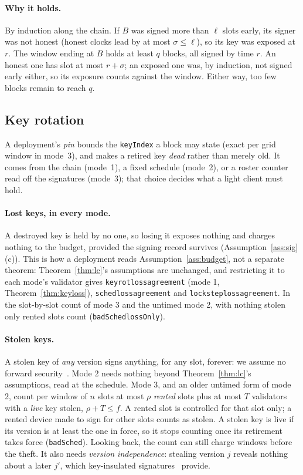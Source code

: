 \documentclass[10pt]{article}
\DeclareRobustCommand{\code}[1]{{\renewcommand{\_}{\textunderscore\allowbreak}\texttt{#1}}}
\newcommand{\quorum}{\ensuremath{q}}
\newcommand{\fmax}{\ensuremath{f}}
\begin{document}
\paragraph{Why it holds.} By induction along the chain. If $B$ was signed
more than $\ell$ slots early, its signer was not honest (honest clocks
lead by at most $\sigma \le \ell$), so its key was exposed at $r$. The
window ending at $B$ holds at least $\quorum$ blocks, all signed by time
$r$. An honest one has slot at most $r + \sigma$; an exposed one was, by
induction, not signed early either, so its exposure counts against the
window. Either way, too few blocks remain to reach $\quorum$.

\subsection{Key rotation}
\label{sec:rotation}

A deployment's \emph{pin} bounds the \code{keyIndex} a block may state
(exact per grid window in mode~3), and makes a retired key \emph{dead}
rather than merely old. It comes from the chain (mode~1), a fixed
schedule (mode~2), or a roster counter read off the signatures (mode~3);
that choice decides what a light client must hold.

\paragraph{Lost keys, in every mode.} A destroyed key is held by no one,
so losing it exposes nothing and charges nothing to the budget, provided
the signing record survives (Assumption~\ref{ass:sig}(c)). This is how a
deployment reads Assumption~\ref{ass:budget}, not a separate theorem:
Theorem~\ref{thm:lc}'s assumptions are unchanged, and restricting it to
each mode's validator gives \code{keyrot\_loss\_agreement} (mode 1,
Theorem~\ref{thm:keyloss}), \code{sched\_loss\_agreement} and
\code{lockstep\_loss\_agreement}. In the slot-by-slot count of mode 3 and the untimed
mode 2, with nothing stolen only rented slots count (\code{badSched\_lossOnly}).

\paragraph{Stolen keys.} A stolen key of \emph{any} version signs
anything, for any slot, forever: we assume no forward
security~\cite{forwardsec}. Mode 2 needs nothing beyond
Theorem~\ref{thm:lc}'s assumptions, read at the schedule. Mode 3, and an
older untimed form of mode 2, count per window of $n$ slots at most
$\rho$ \emph{rented} slots plus at most $T$ validators with a \emph{live}
key stolen, $\rho + T \le \fmax$. A rented slot is controlled for that
slot only; a rented device made to sign for other slots counts as
stolen. A stolen key is live if its version is at least the one in
force, so it stops counting once its retirement takes force
(\code{badSched}). Looking back, the count can still charge windows
before the theft. It also needs \emph{version independence}: stealing
version $j$ reveals nothing about a later $j'$, which key-insulated
signatures~\cite{keyinsulated,keyinsulatedsig} provide.
\end{document}

